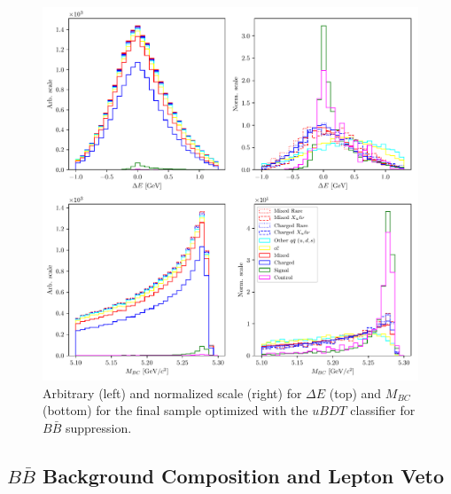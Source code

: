 \begin{figure}[H]
	\centering
	\captionsetup{width=0.8\linewidth}
	\includegraphics[width=\linewidth]{fig/opt_uBB}
	\caption{Arbitrary (left) and normalized scale (right) for $\Delta E$ (top) and $M_{BC}$ (bottom) for the final sample optimized with the $uBDT$ classifier for $B \bar B$ suppression.}
	\label{fig:opt1dc}
\end{figure} 

\subsection{\texorpdfstring{$B \bar B$}{BB-bar} Background Composition and Lepton Veto}

